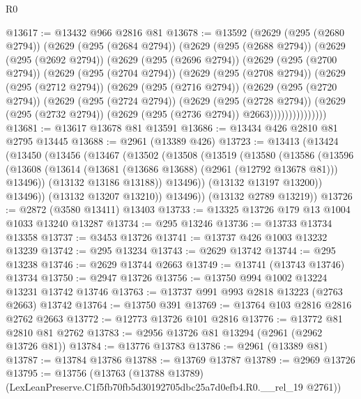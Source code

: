 \begin{lexlean}{R0}
\begin{coremodule}
@13617 := @13432 @966 @2816 @81
@13678 := @13592
    (@2629
      (@295 (@2680 @2794))
      (@2629
        (@295 (@2684 @2794))
        (@2629
          (@295 (@2688 @2794))
          (@2629
            (@295 (@2692 @2794))
            (@2629
              (@295 (@2696 @2794))
              (@2629
                (@295 (@2700 @2794))
                (@2629
                  (@295 (@2704 @2794))
                  (@2629
                    (@295 (@2708 @2794))
                    (@2629
                      (@295 (@2712 @2794))
                      (@2629
                        (@295 (@2716 @2794))
                        (@2629
                          (@295 (@2720 @2794))
                          (@2629
                            (@295 (@2724 @2794))
                            (@2629
                              (@295 (@2728 @2794))
                              (@2629
                                (@295 (@2732 @2794))
                                (@2629 (@295 (@2736 @2794)) @2663)))))))))))))))
@13681 := @13617 @13678 @81 @13591
@13686 := @13434 @426 @2810 @81 @2795 @13445
@13688 := @2961 (@13389 @426)
@13723 := @13413
    (@13424
      (@13450
        (@13456
          (@13467
            (@13502
              (@13508
                (@13519
                  (@13580
                    (@13586
                      (@13596
                        (@13608
                          (@13614 (@13681 (@13686 @13688) (@2961 (@12792 @13678 @81))) @13496))
                        (@13132 @13186 @13188))
                      @13496))
                  (@13132 @13197 @13200))
                @13496))
            (@13132 @13207 @13210))
          @13496))
      (@13132 @2789 @13219))
@13726 := @2872 (@3580 @13411) @13403
@13733 := @13325 @13726 @179 @13 @1004 @1033 @13240 @13287
@13734 := @295 @13246
@13736 := @13733 @13734 @13358
@13737 := @3453 @13726
@13741 := @13737 @426 @1003 @13232 @13239
@13742 := @295 @13234
@13743 := @2629 @13742
@13744 := @295 @13238
@13746 := @2629 @13744 @2663
@13749 := @13741 (@13743 @13746) @13734
@13750 := @2947 @13726
@13756 := @13750 @994 @1002 @13224 @13231 @13742 @13746
@13763 := @13737 @991 @993 @2818 @13223 (@2763 @2663) @13742
@13764 := @13750 @391
@13769 := @13764 @103 @2816 @2816 @2762 @2663
@13772 := @12773 @13726 @101 @2816
@13776 := @13772 @81 @2810 @81 @2762
@13783 := @2956 @13726 @81 @13294 (@2961 (@2962 @13726 @81))
@13784 := @13776 @13783
@13786 := @2961 (@13389 @81)
@13787 := @13784 @13786
@13788 := @13769 @13787
@13789 := @2969 @13726
@13795 := @13756
    (@13763 (@13788 @13789) (LexLeanPreserve.C1f5fb70fb5d30192705dbc25a7d0efb4.R0.__rel_19 @2761))

\end{coremodule}
\end{lexlean}
